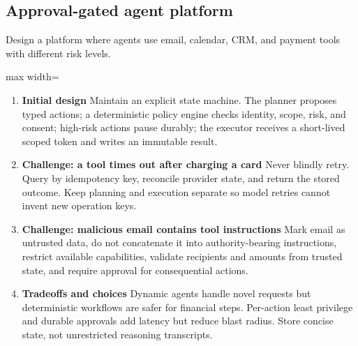 \subsection{Approval-gated agent platform}
Design a platform where agents use email, calendar, CRM, and payment tools with different risk levels.
\begin{center}\begin{adjustbox}{max width=\linewidth}\end{adjustbox}\end{center}
\begin{enumerate}
\item \textbf{Initial design} Maintain an explicit state machine. The planner proposes typed actions; a deterministic policy engine checks identity, scope, risk, and consent; high-risk actions pause durably; the executor receives a short-lived scoped token and writes an immutable result.
\item \textbf{Challenge: a tool times out after charging a card} Never blindly retry. Query by idempotency key, reconcile provider state, and return the stored outcome. Keep planning and execution separate so model retries cannot invent new operation keys.
\item \textbf{Challenge: malicious email contains tool instructions} Mark email as untrusted data, do not concatenate it into authority-bearing instructions, restrict available capabilities, validate recipients and amounts from trusted state, and require approval for consequential actions.
\item \textbf{Tradeoffs and choices} Dynamic agents handle novel requests but deterministic workflows are safer for financial steps. Per-action least privilege and durable approvals add latency but reduce blast radius. Store concise state, not unrestricted reasoning transcripts.
\end{enumerate}
